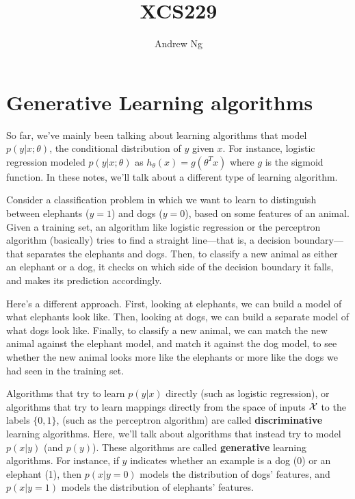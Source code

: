 \documentclass{article}
\begin{document}
\title{XCS229}
\author{Andrew Ng}
\date{}
\maketitle


\setcounter{part}{3}
\part{Generative Learning algorithms}

So far, we've mainly been talking about learning algorithms that model $p(y|x;\theta)$, the
conditional distribution of $y$ given $x$.  For instance, logistic regression modeled
$p(y|x; \theta)$ as $h_\theta(x) = g(\theta^Tx)$ where $g$ is the sigmoid function.  In
these notes, we'll talk about a different type of learning algorithm.

Consider a classification problem in which we want to learn to distinguish between elephants ($y=1$)
and dogs ($y=0$), based on some features of an animal.  Given a training
set, an algorithm like logistic regression or the perceptron algorithm (basically) tries to
find a straight line---that is, a decision boundary---that separates the elephants and
dogs.  Then, to classify a new animal as either an elephant or a dog, it checks on which side of
the decision boundary it falls, and makes its prediction accordingly.

Here's a different approach.  First, looking at elephants, we can build a model of what
elephants look like.  Then, looking at dogs, we can build a separate model of what
dogs look like.  Finally, to classify a new animal, we can match the new animal against the
elephant model, and match it against the dog model, to see whether the new animal looks more
like the elephants or more like the dogs we had seen in the training set.

Algorithms that try to learn $p(y|x)$ directly (such as logistic regression), or algorithms
that try to learn mappings directly from the space of inputs ${\cal X}$ to the labels $\{0,1\}$,
(such as the perceptron algorithm) are called {\bf discriminative} learning algorithms.
Here, we'll talk about algorithms that instead try to model $p(x|y)$ (and $p(y)$).
These algorithms are called {\bf generative} learning algorithms.
For instance, if $y$ indicates whether an example is a dog (0) or an elephant
(1), then $p(x|y=0)$ models the distribution of dogs' features, and $p(x|y=1)$ models
the distribution of elephants' features.
\end{document}

